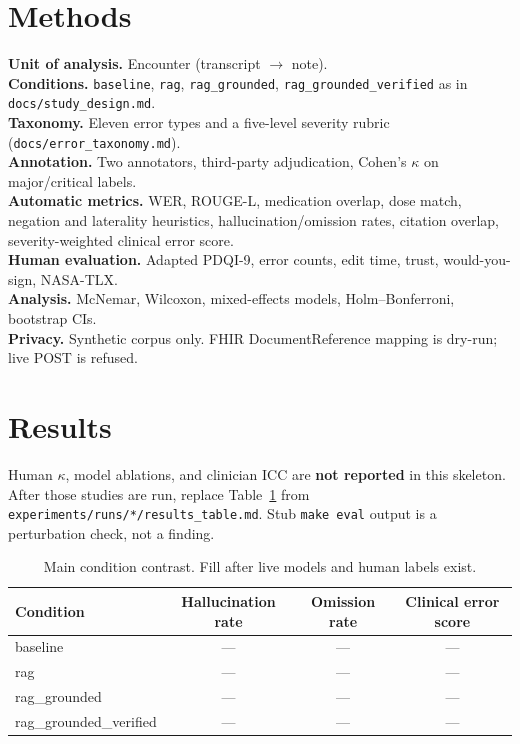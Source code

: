 \documentclass[11pt]{article}
\begin{document}
\section{Methods}
\textbf{Unit of analysis.} Encounter (transcript $\rightarrow$ note).\\
\textbf{Conditions.} \texttt{baseline}, \texttt{rag}, \texttt{rag\_grounded}, \texttt{rag\_grounded\_verified} as in \texttt{docs/study\_design.md}.\\
\textbf{Taxonomy.} Eleven error types and a five-level severity rubric (\texttt{docs/error\_taxonomy.md}).\\
\textbf{Annotation.} Two annotators, third-party adjudication, Cohen's $\kappa$ on major/critical labels.\\
\textbf{Automatic metrics.} WER, ROUGE-L, medication overlap, dose match, negation and laterality heuristics, hallucination/omission rates, citation overlap, severity-weighted clinical error score.\\
\textbf{Human evaluation.} Adapted PDQI-9, error counts, edit time, trust, would-you-sign, NASA-TLX.\\
\textbf{Analysis.} McNemar, Wilcoxon, mixed-effects models, Holm--Bonferroni, bootstrap CIs.\\
\textbf{Privacy.} Synthetic corpus only. FHIR DocumentReference mapping is dry-run; live POST is refused.

\section{Results}
Human $\kappa$, model ablations, and clinician ICC are \textbf{not reported} in this skeleton. After those studies are run, replace Table~\ref{tab:main} from \texttt{experiments/runs/*/results\_table.md}. Stub \texttt{make eval} output is a perturbation check, not a finding.

\begin{table}[h]
\centering
\caption{Main condition contrast. Fill after live models and human labels exist.}
\label{tab:main}
\begin{tabular}{lccc}
\toprule
Condition & Hallucination rate & Omission rate & Clinical error score \\
\midrule
baseline & --- & --- & --- \\
rag & --- & --- & --- \\
rag\_grounded & --- & --- & --- \\
rag\_grounded\_verified & --- & --- & --- \\
\bottomrule
\end{tabular}
\end{table}
\end{document}
